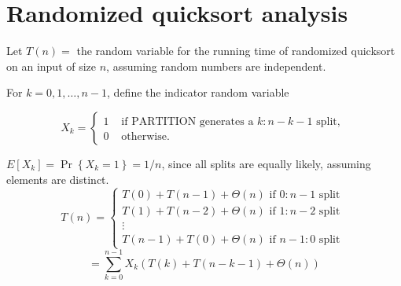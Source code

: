 \documentclass[11pt,toc=twocol]{elegantbook}
\begin{document}
\section{Randomized quicksort analysis}
Let $T(n)=$ the random variable for the running time of randomized quicksort on an input of size $n$, assuming random numbers are independent.

For $k=0,1, \ldots, n-1$, define the indicator random variable

$$
X_{k}= \begin{cases}1 & \text { if PARTITION generates a } k: n-k-1 \text { split, } \\ 0 & \text { otherwise. }\end{cases}
$$

$E\left[X_{k}\right]=\operatorname{Pr}\left\{X_{k}=1\right\}=1 / n$, since all splits are equally likely, assuming elements are distinct.
$$
T(n)=\left\{\begin{array}{c}
T(0)+T(n-1)+\Theta(n) \text { if } 0: n-1 \text { split } \\
T(1)+T(n-2)+\Theta(n) \text { if } 1: n-2 \text { split } \\
\vdots \\
T(n-1)+T(0)+\Theta(n) \text { if } n-1: 0 \text { split }
\end{array}\right.
$$
$$
=\sum_{k=0}^{n-1} X_{k}(T(k)+T(n-k-1)+\Theta(n))
$$
\end{document}
